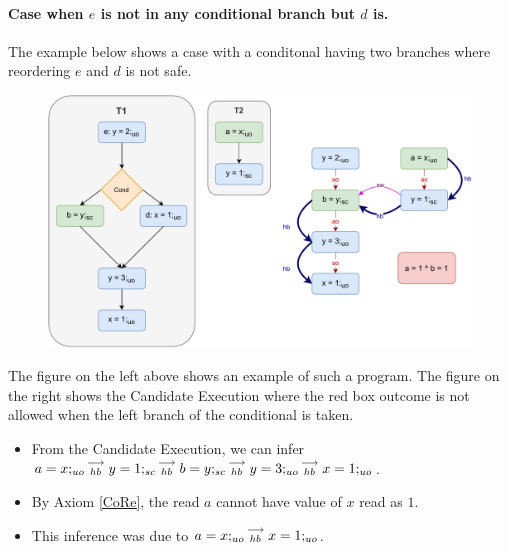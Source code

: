         \paragraph{Case when $e$ is not in any conditional branch but $d$ is.}

            The example below shows a case with a conditonal having two branches where reordering $e$ and $d$ is not safe. 
            \begin{figure}
                \centering 
                \includegraphics[scale=0.7]{InstructionReordering/CounterExamples1a(Conditionals).pdf}
                \caption{}
            \end{figure}

            The figure on the left above shows an example of such a program.  
            The figure on the right shows the Candidate Execution where the red box outcome is not allowed when the left branch of the conditional is taken.
            \begin{itemize}
                \item From the Candidate Execution, we can infer $a=x;_{uo}\stackrel{\longrightarrow}{_{hb}}y=1;_{sc}\stackrel{\longrightarrow}{_{hb}}b=y;_{sc}\stackrel{\longrightarrow}{_{hb}}y=3;_{uo}\stackrel{\longrightarrow}{_{hb}}x=1;_{uo}$.
                \item By Axiom \ref{CoRe}, the read $a$ cannot have value of $x$ read as $1$. 
                \item This inference was due to $a=x;_{uo}\stackrel{\longrightarrow}{_{hb}}x=1;_{uo}$.
            \end{itemize}

